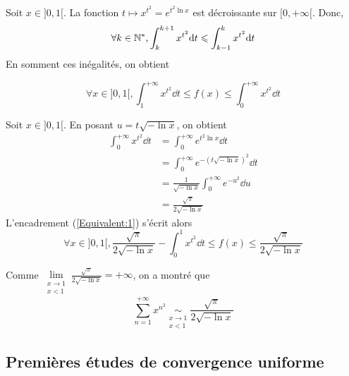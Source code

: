 Soit $x\in]0,1[$. La fonction $t\mapsto x^{t^2} = e^{t^2\ln x}$ est décroissante sur $[0, + \infty [$. Donc, 
\[
    \forall k \in \mathbb{N}^*, \int_k^{k+1} x^{t^2} \mathrm{d} t \leqslant \int_{k-1}^k x^{t^2} \mathrm{d} t
\]
En somment ces inégalités, on obtient

\begin{equation}\label{Equivalent:1}
    \forall x \in ]0,1[, \int_1^{+\infty} x^{t^2} \dd t \leqslant f(x) \leqslant \int_0^{+\infty} x^{t^2} \dd t
\end{equation}

Soit $x\in]0,1[$. En posant $u=t\sqrt{-\ln x}$, on obtient
\[
    \begin{aligned}
        \int_0^{+\infty} x^{t^2} \dd t &= \int_0^{+\infty} e^{t^2 \ln x} \dd t\\
        &= \int_0^{+\infty} e^{-\left(t\sqrt{-\ln x}\right)^2} \dd t\\
        &= \frac{1}{\sqrt{-\ln x}} \int_0^{+\infty} e^{-u^2} \dd u\\
        &= \frac{\sqrt{\pi}}{2\sqrt{-\ln x}}
    \end{aligned}
\]
L'encadrement (\ref{Equivalent:1}) s'écrit alors
\[
    \forall x \in ]0,1[, \frac{\sqrt{\pi}}{2\sqrt{-\ln x}} - \int_0^1 x^{t^2} \dd t\leqslant f(x) \leqslant \frac{\sqrt{\pi}}{2\sqrt{-\ln x}}
\]

Comme $\lim\limits_{\substack{x\to 1 \\ x <1}} \frac{\sqrt{\pi}}{2\sqrt{-\ln x}} = + \infty$, on a montré que
\[
    \sum\limits_{n=1}^{+\infty} x^{n^2} \underset{\substack{x\to 1\\x<1}}{\sim} \frac{\sqrt{\pi}}{2\sqrt{-\ln x}}
\]

\subsection{Premières études de convergence uniforme}


